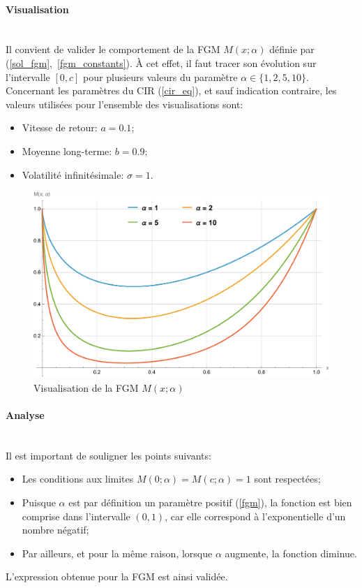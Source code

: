 \paragraph{Visualisation}\phantom{}\\
Il convient de valider le comportement de la \acl{FGM} $M(x;\alpha)$ définie par (\ref{sol_fgm},~\ref{fgm_constants}). À cet effet, il faut tracer son évolution sur l'intervalle $[0, c]$ pour plusieurs valeurs du paramètre $\alpha \in \{1, 2, 5, 10\}$. Concernant les paramètres du \acs{CIR} (\ref{cir_eq}), et sauf indication contraire, les valeurs utilisées pour l'ensemble des visualisations sont:
\begin{itemize}
    \item Vitesse de retour: \(a=0.1\);
    \item Moyenne long-terme: \(b=0.9\);
    \item Volatilité infinitésimale: \(\sigma=1\).
\end{itemize}
\begin{figure}[htb]
    \centering
    \includegraphics[width=0.5\linewidth]{img/validation/fgm.pdf}
    \caption{Visualisation de la \acl{FGM} $M(x;\alpha)$}\label{fig:FGMVisualisation}
\end{figure}
\FloatBarrier\paragraph{Analyse}\phantom{}\\
Il est important de souligner les points suivants:
\begin{itemize}
    \item Les conditions aux limites $M(0; \alpha) = M(c; \alpha) = 1$ sont respectées;
    \item Puisque $\alpha$ est par définition un paramètre positif (\ref{fgm}), la fonction est bien comprise dans l'intervalle $(0, 1)$, car elle correspond à l'exponentielle d'un nombre négatif;
    \item Par ailleurs, et pour la même raison, lorsque $\alpha$ augmente, la fonction diminue.
\end{itemize}
L'expression obtenue pour la \acl{FGM} est ainsi validée. 

